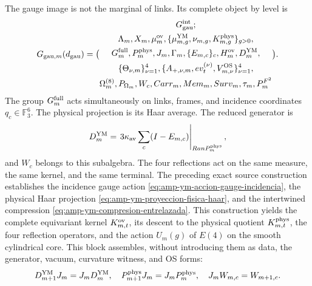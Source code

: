 The gauge image is not the marginal of links. Its complete object by level is
\begin{equation}\label{eq:pdf2-g-gau-explicito}
 \mathfrak G_{{\rm gau},m}(d_{\rm gau})=
 \bigl(
 \begin{gathered}
  \mathfrak G_{\rm gau}^{\rm int};\\
  \Lambda_m,\widehat X_m,\widehat\mu_m^{\rm ov},
  \{\widehat\mu_{m,g}^{\rm YM},\nu_{m,g},K_{m,g}^{\rm phys}\}_{g>0},\\
  \mathcal G_m^{\rm full},\mathbb P_m^{\rm phys},
  \widehat J_m,\widehat\Gamma_m,
  \{E_{m,c}\}_c,\widehat H_m^{\rm ov},D_m^{\rm YM},\\
  \{\Theta_{\nu,m}\}_{\nu=1}^4,
  \{\mathfrak A_{+,\nu,m},\operatorname{ev}_{t}^{(\nu)},
      \mathcal V_{m,\nu}^{\rm OS}\}_{\nu=1}^4,\\
  \widehat\Omega_m^{(8)},P_{\Omega_m},W_c,
  \operatorname{Carr}_m,\operatorname{Mem}_m,
  \operatorname{Surv}_m,\tau_m,\mathcal P_m^{F^2}
 \end{gathered}
 \bigr).
\end{equation}
The group $\mathcal G_m^{\rm full}$ acts simultaneously on links, frames, and
incidence coordinates $q_c\in\mathbb F_3^6$. The physical projection is its Haar
average. The reduced generator is
\begin{equation}\label{eq:pdf2-g-gau-generador-estructural}
 D_m^{\rm YM}
 =\left.3\kappa_{\rm av}\sum_c(I-E_{m,c})
  \right|_{\operatorname{Ran}\mathbb P_m^{\rm phys}},
\end{equation}
and $W_c$ belongs to this subalgebra. The four reflections act on the same
measure, the same kernel, and the same terminal.
The preceding exact source construction establishes the incidence gauge action
\eqref{eq:amp-ym-accion-gauge-incidencia}, the physical Haar projection
\eqref{eq:amp-ym-proyeccion-fisica-haar}, and the intertwined compression
\eqref{eq:amp-ym-compresion-entrelazada}. This construction yields the
complete equivariant kernel $\widehat K_{m,t}^{\rm ov}$, its descent to the
physical quotient $K_{m,t}^{\rm phys}$, the four reflection operators, and
the action $U_m(g)$ of $E(4)$ on the smooth cylindrical core. This block
assembles, without introducing them as data, the generator, vacuum, curvature
witness, and OS forms:
\begin{equation}\label{eq:pdf2-g-gau-entrelazamiento-dato}
 D_{m+1}^{\rm YM}\widehat J_m=\widehat J_mD_m^{\rm YM},
 \quad
 \mathbb P_{m+1}^{\rm phys}\widehat J_m
  =\widehat J_m\mathbb P_m^{\rm phys},
 \quad
 \widehat J_mW_{m,c}=W_{m+1,c}.
\end{equation}
